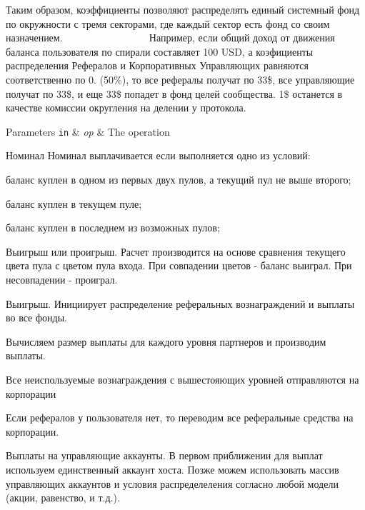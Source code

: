 Таким образом, коэффициенты позволяют распределять единый системный фонд по окружности с тремя секторами, где каждый сектор есть фонд со своим назначением. ~\newline
~\newline
~\newline
~\newline
~\newline
~\newline
~\newline
~\newline
~\newline
~\newline
 Например, если общий доход от движения баланса пользователя по спирали составляет 100 U\+SD, а коэфициенты распределения Рефералов и Корпоративных Управляющих равняются соответственно по 0. (50\%), то все рефералы получат по 33\$, все управляющие получат по 33\$, и еще 33\$ попадет в фонд целей сообщества. 1\$ останется в качестве комиссии округления на делении у протокола.


\begin{DoxyParams}[1]{Parameters}
\mbox{\tt in}  & {\em op} & The operation \\
\hline
\end{DoxyParams}
Номинал Номинал выплачивается если выполняется одно из условий\+:
\begin{DoxyItemize}
\item баланс куплен в одном из первых двух пулов, а текущий пул не выше второго;
\item баланс куплен в текущем пуле;
\item баланс куплен в последнем из возможных пулов;
\end{DoxyItemize}

Выигрыш или проигрыш. Расчет производится на основе сравнения текущего цвета пула с цветом пула входа. При совпадении цветов -\/ баланс выиграл. При несовпадении -\/ проиграл.

Выигрыш. Инициирует распределение реферальных вознаграждений и выплаты во все фонды.

Вычисляем размер выплаты для каждого уровня партнеров и производим выплаты.

Все неиспользуемые вознаграждения с вышестояющих уровней отправляются на корпорации

Если рефералов у пользователя нет, то переводим все реферальные средства на корпорации.

Выплаты на управляющие аккаунты. В первом приближении для выплат используем единственный аккаунт хоста. Позже можем использовать массив управляющих аккаунтов и условия распределеления согласно любой модели (акции, равенство, и т.\+д.).

